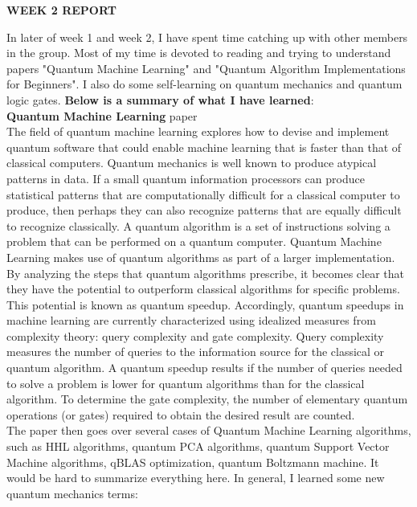 \documentclass{article}
\begin{document}
\begin{center}
\textbf{WEEK 2 REPORT}
\end{center}

In later of week 1 and week 2, I have spent time catching up with other members in the group. Most of my time is devoted to reading and trying to understand papers "Quantum Machine Learning" and "Quantum Algorithm Implementations for Beginners". I also do some self-learning on quantum mechanics and quantum logic gates. \textbf{Below is a summary of what I have learned}: \\

\textbf{Quantum Machine Learning} paper \\

The field of quantum machine learning explores how to devise and implement quantum software that could enable machine learning that is faster than that of classical computers. Quantum mechanics is well known to produce atypical patterns in data. If a small quantum information processors can produce statistical patterns that are computationally difficult for a classical computer to produce, then perhaps they can also recognize patterns that are equally difficult to recognize classically. A quantum algorithm is a set of instructions solving a problem that can be performed on a quantum computer. Quantum Machine Learning makes use of quantum algorithms as part of a larger implementation. By analyzing the steps that quantum algorithms prescribe, it becomes clear that they have the potential to outperform classical algorithms for specific problems. This potential is known as quantum speedup. Accordingly, quantum speedups in machine learning are currently characterized using idealized measures from complexity theory: query complexity and gate complexity. Query complexity measures the number of queries to the information source for the classical or quantum algorithm. A quantum speedup results if the number of queries needed to solve a problem is lower for quantum algorithms than for the classical algorithm. To determine the gate complexity, the number of elementary quantum operations (or gates) required to obtain the desired result are counted. \\

The paper then goes over several cases of Quantum Machine Learning algorithms, such as HHL algorithms, quantum PCA algorithms, quantum Support Vector Machine algorithms, qBLAS optimization, quantum Boltzmann machine. It would be hard to summarize everything here. In general, I learned some new quantum mechanics terms: 
\end{document}
